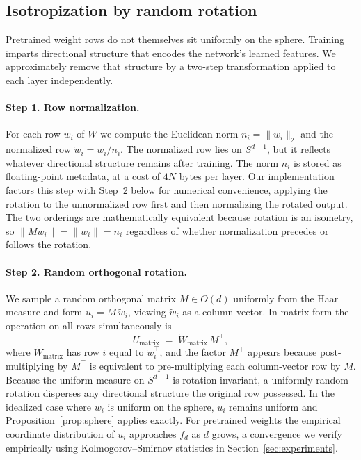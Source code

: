 \subsection{Isotropization by random rotation}
\label{sec:method-rotation}

Pretrained weight rows do not themselves sit uniformly on the sphere.
Training imparts directional structure that encodes the network's learned
features. We approximately remove that structure by a two-step
transformation applied to each layer independently.

\paragraph{Step 1. Row normalization.}
For each row $w_i$ of $W$ we compute the Euclidean norm $n_i = \|w_i\|_2$
and the normalized row $\widetilde{w}_i = w_i / n_i$. The normalized row
lies on $S^{d-1}$, but it reflects whatever directional structure remains
after training. The norm $n_i$ is stored as floating-point metadata, at a
cost of $4N$ bytes per layer. Our implementation factors this step with
Step~2 below for numerical convenience, applying the rotation to the
unnormalized row first and then normalizing the rotated output. The two
orderings are mathematically equivalent because rotation is an isometry,
so $\|M w_i\| = \|w_i\| = n_i$ regardless of whether normalization
precedes or follows the rotation.

\paragraph{Step 2. Random orthogonal rotation.}
We sample a random orthogonal matrix $M \in O(d)$ uniformly from the Haar
measure and form $u_i = M\, \widetilde{w}_i$, viewing $\widetilde{w}_i$ as a
column vector. In matrix form the operation on all rows simultaneously is
\begin{equation}
U_{\text{matrix}}
  \;=\; \widetilde{W}_{\text{matrix}}\, M^\top,
\label{eq:forward-matrix}
\end{equation}
where $\widetilde{W}_{\text{matrix}}$ has row $i$ equal to
$\widetilde{w}_i^\top$, and the factor $M^\top$ appears because post-
multiplying by $M^\top$ is equivalent to pre-multiplying each column-vector
row by $M$. Because the uniform measure on $S^{d-1}$ is rotation-invariant,
a uniformly random rotation disperses any directional structure the
original row possessed. In the idealized case where $\widetilde{w}_i$ is
uniform on the sphere, $u_i$ remains uniform and Proposition~\ref{prop:sphere}
applies exactly. For pretrained weights the empirical coordinate
distribution of $u_i$ approaches $f_d$ as $d$ grows, a convergence we
verify empirically using Kolmogorov--Smirnov statistics in
Section~\ref{sec:experiments}.

